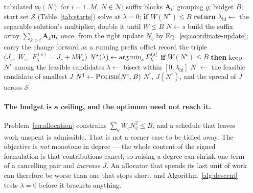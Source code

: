 \begin{algorithm}[!htbp]
\caption{Budgeted coordinate descent for Eq.~\eqref{eq:allocation}}
\label{alg:descent}
\begin{algorithmic}[1]
\Require tabulated $\mathbf u_i(N)$ for $i=1..M$, $N\in\mathcal{N}$; suffix
  blocks $\mathbf A_i$; grouping $g$; budget $B$; start set $\mathcal{S}$
  (Table~\ref{tab:starts})
\State solve at $\lambda=0$; \textbf{if} $W(N^\star)\le B$ \textbf{return}
\State $\lambda_{\mathrm{hi}} \gets$ the separable solution's multiplier;
  double it until $W\le B$ 
\Repeat {}
   
    \State $N \gets s$
    \Repeat {}
      \State build the suffix array $\sum_{k>i}\mathbf A_k\mathbf u_k$ once,
        from the right 
        \State update $N_q$ by Eq.~\eqref{eq:coordinate-update}; carry the
          change forward as a running prefix offset
      \EndFor
    \State record the triple $\bigl(J_s,\;W_s,\;
      F_\lambda^{(s)}=J_s+\lambda W_s\bigr)$
  \EndFor
  \State $N^\star(\lambda) \gets \operatorname*{arg\,min}_s F_\lambda^{(s)}$
  \State \textbf{if} $W(N^\star)\le B$ \textbf{then} keep $N^\star$ among the
    feasible candidates 
  \State $\lambda \gets$ bisect within $[0,\lambda_{\mathrm{hi}}]$
\State $N^{\dagger} \gets$ the feasible candidate of smallest $J$
\State $N^{\dagger} \gets \textsc{Polish}(N^{\dagger},B)$
\State \Return $N^{\dagger}$, $J(N^{\dagger})$, and the spread of $J$ across
  $\mathcal{S}$
\end{algorithmic}
\end{algorithm}

\paragraph{The budget is a ceiling, and the optimum need not reach it.}
Problem~\eqref{eq:allocation} constrains $\sum_qW_qN_q^2\le B$, and a schedule
that leaves work unspent is admissible. That is not a corner case to be tidied
away. The objective is \emph{not} monotone in degree --- the whole content of
the signed formulation is that contributions cancel, so raising a degree can
shrink one term of a cancelling pair and \emph{increase} $J$. An allocator that
spends its last unit of work can therefore be worse than one that stops short,
and Algorithm~\ref{alg:descent} tests $\lambda=0$ before it brackets anything.

